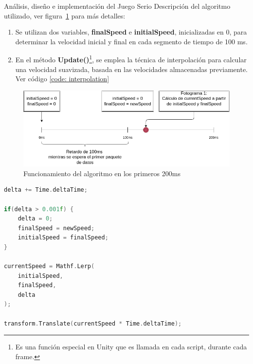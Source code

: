 \begin{thesischapter}{2} {Análisis, diseño e implementación del Juego Serio}
    \vspace{10pt}
    Descripción del algoritmo utilizado, ver figura~\ref{fig: interpolation-algorithm} para más detalles:
    \begin{enumerate}
        \item Se utilizan dos variables, \textbf{finalSpeed} e \textbf{initialSpeed}, inicializadas en 0, para determinar la velocidad inicial y final en cada segmento de tiempo de 100 ms.
        \item En el método \textbf{Update()}\footnote{Es una función especial en Unity que es llamada en cada script, durante cada frame.}, se emplea la técnica de interpolación para calcular 
        una velocidad suavizada, basada en las velocidades almacenadas previamente. Ver código \ref{code: interpolation}
    \end{enumerate} 

    \begin{figure}[ht]
        \centering
        \includegraphics[scale=0.4]{images/interpolation-algorithm.png}
        \caption{Funcionamiento del algoritmo en los primeros 200ms}
        \label{fig: interpolation-algorithm}
    \end{figure}

\begin{center}
\begin{minipage}{0.8\textwidth}
\begin{lstlisting}[language=c, label={code: interpolation}, caption={Controlador de movimiento}]
delta += Time.deltaTime;
 
if(delta > 0.001f) {
    delta = 0;
    finalSpeed = newSpeed;
    initialSpeed = finalSpeed;
}

currentSpeed = Mathf.Lerp( 
    initialSpeed, 
    finalSpeed, 
    delta
);

transform.Translate(currentSpeed * Time.deltaTime);
\end{lstlisting}
\end{minipage}
\end{center}



\end{thesischapter}
